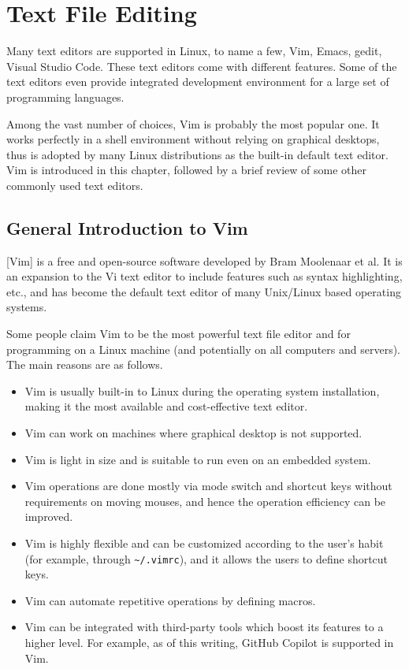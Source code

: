 \chapter{Text File Editing} \label{ch:tfe}

Many text editors are supported in Linux, to name a few, Vim, Emacs, gedit, Visual Studio Code. These text editors come with different features. Some of the text editors even provide integrated development environment for a large set of programming languages.

Among the vast number of choices, Vim is probably the most popular one. It works perfectly in a shell environment without relying on graphical desktops, thus is adopted by many Linux distributions as the built-in default text editor. Vim is introduced in this chapter, followed by a brief review of some other commonly used text editors.

\section{General Introduction to Vim}

[Vim] is a free and open-source software developed by Bram Moolenaar et al. It is an expansion to the Vi text editor to include features such as syntax highlighting, etc., and has become the default text editor of many Unix/Linux based operating systems.

Some people claim Vim to be the most powerful text file editor and  for programming on a Linux machine (and potentially on all computers and servers). The main reasons are as follows.
\begin{itemize}
  \item Vim is usually built-in to Linux during the operating system installation, making it the most available and cost-effective text editor.
  \item Vim can work on machines where graphical desktop is not supported.
  \item Vim is light in size and is suitable to run even on an embedded system.
  \item Vim operations are done mostly via mode switch and shortcut keys without requirements on moving mouses, and hence the operation efficiency can be improved.
  \item Vim is highly flexible and can be customized according to the user's habit (for example, through \verb|~/.vimrc|), and it allows the users to define shortcut keys.
  \item Vim can automate repetitive operations by defining macros.
  \item Vim can be integrated with third-party tools which boost its features to a higher level. For example, as of this writing, GitHub Copilot is supported in Vim.
\end{itemize}

